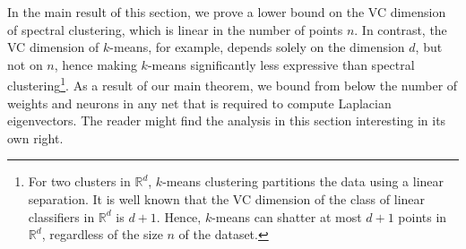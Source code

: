 \documentclass{article} %
\begin{document}
In the main result of this section, we prove a lower bound on the VC dimension of spectral clustering, which is linear in the number of points $n$.
In contrast, the VC dimension of $k$-means, for example, depends solely on the dimension $d$, but not on $n$, hence making $k$-means significantly less expressive than spectral clustering\footnote{For two clusters in $\mathbb{R}^d$, $k$-means clustering partitions the data using a linear separation. It is well known that the VC dimension of the class of linear classifiers in $\mathbb{R}^d$ is $d+1$. Hence, $k$-means can shatter at most $d+1$ points in $\mathbb{R}^d$, regardless of the size $n$ of the dataset. }.
As a result of our main theorem, we bound from below the number of weights and neurons in any net that is required to compute Laplacian eigenvectors.
The reader might find the analysis in this section interesting in its own right.


%
%
%
\end{document}
